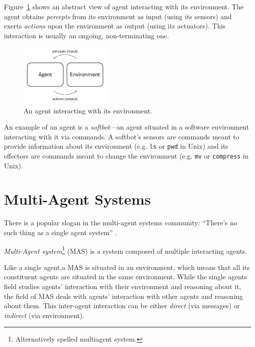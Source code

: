 Figure~\ref{figure:agent-environment-interaction} shows an abstract view of agent interacting with its environment.
The agent obtains \textit{percepts} from its environment as input (using its sensors) and exerts \textit{actions} upon the environment as output (using its actuators).
This interaction is usually an ongoing, non-terminating one.

\begin{figure}[h]
	\centering
	\includegraphics[width=0.4\textwidth]{images/agent-environment-interaction.png}
	\caption{An agent interacting with its environment.}
	\label{figure:agent-environment-interaction}
\end{figure}

An example of an agent is a \textit{softbot}---an agent situated in a software environment interacting with it via commands. A softbot's sensors are commands meant to provide information about its environment (e.g. \texttt{ls} or \texttt{pwd} in Unix) and its effectors are commands meant to change the environment (e.g. \texttt{mv} or \texttt{compress} in Unix).

\section{Multi-Agent Systems}

There is a popular slogan in the multi-agent systems community: ``There's no such thing as a single agent system'' \cite{Wooldridge09}.

\textit{Multi-Agent system}\footnote{Alternatively spelled multiagent system.} (MAS) is a system composed of multiple interacting agents.

Like a single agent,a MAS is situated in an environment, which means that all its constituent agents are situated in the same environment.
While the single agents field studies agents' interaction with their environment and reasoning about it, the field of MAS deals with agents' interaction with other agents and reasoning about them.
This inter-agent interaction can be either \textit{direct} (via messages) or \textit{indirect} (via environment).

